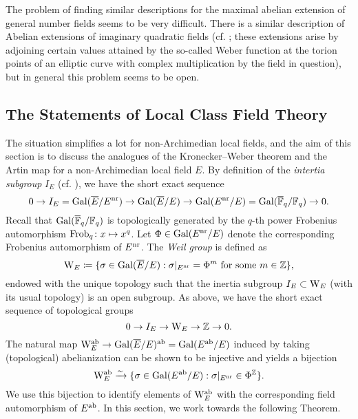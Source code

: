 \documentclass[../main.tex]{subfiles}
\begin{document}
The problem of finding similar descriptions for the maximal abelian extension of
general number fields seems to be very difficult. There is a similar description 
of Abelian extensions of imaginary quadratic fields (cf. \cite[Chapter II,
§5]{silverman1994advanced}; these extensions arise by adjoining certain values attained
by the so-called Weber function at the torion points of an elliptic curve with complex
multiplication by the field in question), but in general this problem seems to be open.

\subsection{The Statements of Local Class Field Theory} %
\label{sub:The Statements of Local Class Field Theory}

The situation simplifies a lot for non-Archimedian local fields, and
the aim of this section is to discuss the analogues of the Kronecker--Weber
theorem and the Artin map for a non-Archimedian local field $E$.
By definition of the \emph{intertia subgroup} $I_E$ (cf. \cite[§1]{serre2013local}),
we have the short exact sequence
\begin{equation*}
  0 \to I_E = \operatorname{Gal}(\overline E/ E^{\mathrm{nr}}) \to \operatorname{Gal}(\overline E/E) \to \operatorname{Gal}(E^{\mathrm{nr}} /E) =
  \operatorname{Gal}(\overline {\mathbb{F}}_q /\mathbb{F}_q) \to 0.
\end{equation*}
Recall that $\operatorname{Gal}({\overline {\mathbb{F}}_q}/\mathbb{F}_q)$ is topologically generated by the $q$-th power
Frobenius automorphism $\mathrm{Frob}_q\colon x \mapsto x^q$. Let $\Phi \in \operatorname{Gal}(E^{\mathrm{nr}} /E)$ 
denote the corresponding Frobenius automorphism of $E^{\mathrm{nr}}$. 
The \emph{Weil group} is defined as
\begin{equation*}
  \mathrm W_E \coloneq \{\sigma \in \operatorname{Gal}(\overline E/E) : \sigma|_{E^{\mathrm{nr}}} = \Phi^m
  \text{ for some } m \in \mathbb{Z}\},
\end{equation*}
endowed with the unique topology such that the inertia subgroup $I_E \subset
\mathrm W_E$ (with its usual topology) is an open subgroup.
As above, we have the short exact sequence of topological groups
\begin{equation*}
  0 \to I_E \to \mathrm W_E \to \mathbb{Z} \to 0.
\end{equation*}
The natural map $\mathrm W_E^{\mathrm{ab}} \to \operatorname{Gal}(\overline E/E)^{\mathrm{ab}} = \operatorname{Gal}(E^{\mathrm{ab}}/E)$ induced by taking
(topological) abelianization can be shown to be injective and yields a bijection
\begin{equation}\label{eq:WeilgroupInjectsIntoGalois}
  \mathrm W_E^{\mathrm{ab}} \xrightarrow{\sim} \{\sigma \in \operatorname{Gal}(E^{\mathrm{ab}}/E) : \sigma|_{E^{\mathrm{nr}}} \in \Phi^{\mathbb{Z}}\}.
\end{equation}
We use this bijection to identify elements of $\mathrm W_E^{\mathrm{ab}}$ with the corresponding field
automorphism of $E^{\mathrm{ab}}$. In this section, we work towards the following Theorem.
\end{document}
